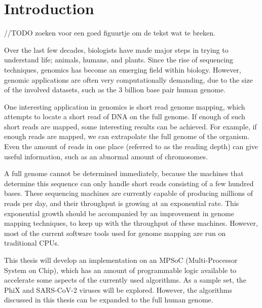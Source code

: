 
\chapter{Introduction}

//TODO zoeken voor een goed figuurtje om de tekst wat te breken.

Over the last few decades, biologists have made major steps in trying to understand life; animals, humans, and plants. Since the rise of sequencing techniques, genomics has become an emerging field within biology. However, genomic applications are often very computationally demanding, due to the size of the involved datasets, such as the 3 billion base pair human genome.

One interesting application in genomics is short read genome mapping, which attempts to locate a short read of DNA on the full genome. If enough of such short reads are mapped, some interesting results can be achieved. For example, if enough reads are mapped, we can extrapolate the full genome of the organism. Even the amount of reads in one place (referred to as the reading depth) can give useful information, such as an abnormal amount of chromosomes.

A full genome cannot be determined immediately, because the machines that determine this sequence can only handle short reads consisting of a few hundred bases. These sequencing machines are currently capable of producing millions of reads per day, and their throughput is growing at an exponential rate. This exponential growth should be accompanied by an improvement in genome mapping techniques, to keep up with the throughput of these machines. However, most of the current software tools used for genome mapping are run on traditional CPUs. 

This thesis will develop an implementation on an MPSoC (Multi-Processor System on Chip), which has an amount of programmable logic available to accelerate some aspects of the currently used algorithms. As a sample set, the PhiX and SARS-CoV-2 viruses will be explored. However, the algorithms discussed in this thesis can be expanded to the full human genome.

